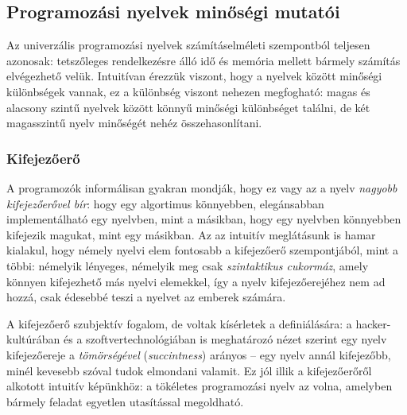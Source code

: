 \subsection{Programozási nyelvek minőségi mutatói}
Az univerzális programozási nyelvek számításelméleti szempontból teljesen azonosak: tetszőleges rendelkezésre álló idő és memória mellett bármely számítás elvégezhető velük.
Intuitívan érezzük viszont, hogy a nyelvek között minőségi különbségek vannak, ez a különbség viszont nehezen megfogható: magas és alacsony szintű nyelvek között könnyű minőségi különbséget találni, de két magasszintű nyelv minőségét nehéz összehasonlítani.

\subsubsection{Kifejezőerő}
A programozók informálisan gyakran mondják, hogy ez vagy az a nyelv \textit{nagyobb kifejezőerővel bír}: hogy egy algortimus könnyebben, elegánsabban implementálható egy nyelvben, mint a másikban, hogy egy nyelvben könnyebben kifejezik magukat, mint egy másikban.
Az az intuitív meglátásunk is hamar kialakul, hogy némely nyelvi elem fontosabb a kifejezőerő szempontjából, mint a többi: némelyik lényeges, némelyik meg csak \textit{szintaktikus cukormáz}, amely könnyen kifejezhető más nyelvi elemekkel, így a nyelv kifejezőerejéhez nem ad hozzá, csak édesebbé teszi a nyelvet az emberek számára.\cite{Landin64}

A kifejezőerő szubjektív fogalom, de voltak kísérletek a definiálására: a hacker-kultúrában\cite{Graham02} és a szoftvertechnológiában\cite{MythManMonth}\cite{CodeComplete} is meghatározó nézet szerint egy nyelv kifejezőereje a \textit{tömörségével} (\textit{succintness}) arányos -- egy nyelv annál kifejezőbb, minél kevesebb szóval tudok elmondani valamit.
Ez jól illik a kifejezőerőről alkotott intuitív képünkhöz: a tökéletes programozási nyelv az volna, amelyben bármely feladat egyetlen utasítással megoldható.

